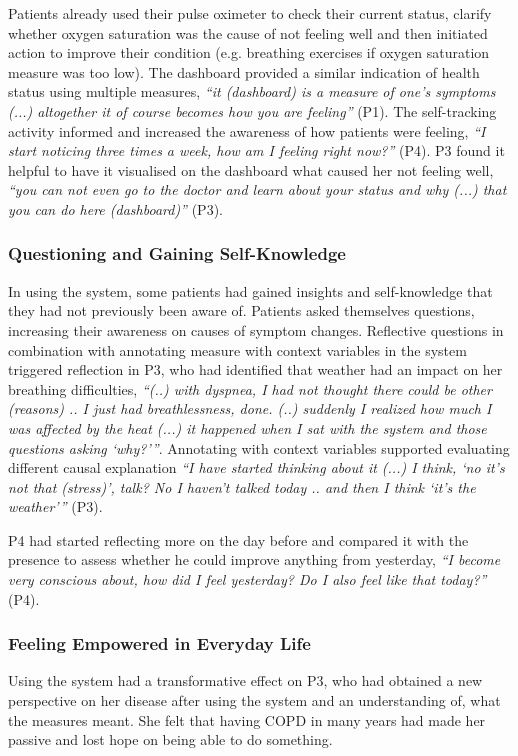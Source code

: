 Patients already used their pulse oximeter to check their current status, clarify whether oxygen saturation was the cause of not feeling well and then initiated action to improve their condition (e.g. breathing exercises if oxygen saturation measure was too low). The dashboard provided a similar indication of health status using multiple measures, \textit{“it (dashboard) is a measure of one’s symptoms (...) altogether it of course becomes how you are feeling”} (P1). The self-tracking activity informed and increased the awareness of how patients were feeling, \textit{“I start noticing three times a week, how am I feeling right now?”} (P4). P3 found it helpful to have it visualised on the dashboard what caused her not feeling well, \textit{“you can not even go to the doctor and learn about your status and why (...) that you can do here (dashboard)”} (P3). 




\subsubsection{Questioning and Gaining Self-Knowledge}
In using the system, some patients had gained insights and self-knowledge that they had not previously been aware of. Patients asked themselves questions, increasing their awareness on causes of symptom changes. Reflective questions in combination with annotating measure with context variables in  the system triggered reflection in P3, who had identified that weather had an impact on her breathing difficulties, \textit{“(..) with dyspnea, I had not thought there could be other (reasons) .. I just had breathlessness, done. (..) suddenly I realized how much I was affected by the heat (...) it happened when I sat with the system and those questions asking ‘why?’”}. Annotating with context variables supported evaluating different causal explanation \textit{“I have started thinking about it (...) I think, ‘no it’s not that (stress)’, talk? No I haven’t talked today .. and then I think ‘it’s the weather’”} (P3).
 
P4 had started reflecting more on the day before and compared it with the presence to assess whether he could improve anything from yesterday, \textit{“I become very conscious about, how did I feel yesterday? Do I also feel like that today?”} (P4).

\subsubsection{Feeling Empowered in Everyday Life}
Using the system had a transformative effect on P3, who had obtained a new perspective on her disease after using the system and an understanding of, what the measures meant. She felt that having COPD in many years had made her passive and lost hope on being able to do something. 

